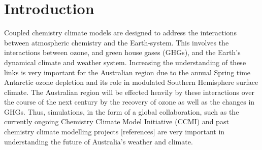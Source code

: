 \section{Introduction} 

Coupled chemistry climate models are designed to address the interactions between atmospheric chemistry and the Earth-system. This involves the interactions between ozone, and green house gases (GHGs), and the Earth's dynamical climate and weather system. Increasing the understanding of these links is very important for the Australian region due to the annual Spring time Antarctic ozone depletion and its role in modulated Southern Hemisphere surface climate. The Australian region will be effected heavily by these interactions over the course of the next century by the recovery of ozone as well as the changes in GHGs. Thus, simulations, in the form of a global collaboration, such as the currently ongoing Chemistry Climate Model Initiative (CCMI) \citep{Eyring:2013tg} and past chemistry climate modelling projects [references] are very important in understanding the future of Australia's weather and climate.

